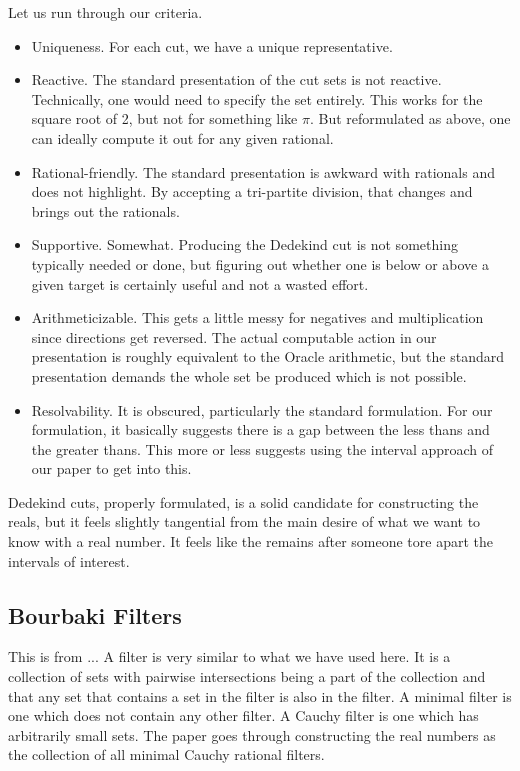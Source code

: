 \documentclass[12pt]{article}
\theoremstyle{remark}
\begin{document}
Let us run through our criteria. 

\begin{itemize}
    \item Uniqueness. For each cut, we have a unique representative.
    \item Reactive. The standard presentation of the cut sets is not reactive. Technically, one would need to specify the set entirely. This works for the square root of 2, but not for something like $\pi$. But reformulated as above, one can ideally compute it out for any given rational. 
    \item Rational-friendly. The standard presentation is awkward with rationals and does not highlight. By accepting a tri-partite division, that changes and brings out the rationals. 
    \item Supportive. Somewhat. Producing the Dedekind cut is not something typically needed or done, but figuring out whether one is below or above a given target is certainly useful and not a wasted effort. 
    \item Arithmeticizable. This gets a little messy for negatives and multiplication since directions get reversed. The actual computable action in our presentation is roughly equivalent to the Oracle arithmetic, but the standard presentation demands the whole set be produced which is not possible.
    \item Resolvability. It is obscured, particularly the standard formulation. For our formulation, it basically suggests there is a gap between the less thans and the greater thans. This more or less suggests using the interval approach of our paper to get into this. 
\end{itemize}

Dedekind cuts, properly formulated, is a solid candidate for constructing the reals, but it feels slightly tangential from the main desire of what we want to know with a real number. It feels like the remains after someone tore apart the intervals of interest. 

\subsection{Bourbaki Filters}

This is from ... A filter is very similar to what we have used here. It is a collection of sets with pairwise intersections being a part of the collection and that any set that contains a set in the filter is also in the filter. A minimal filter is one which does not contain any other filter. A Cauchy filter is one which has arbitrarily small sets. The paper goes through constructing the real numbers as the collection of all minimal Cauchy rational filters. 
\end{document}

